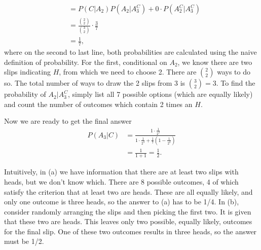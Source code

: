 \begin{exercise}[BH.2.21]
\begin{solution}
\begin{enumerate}
\begin{align*}
			&=P(C|A_{2})P(A_{2}|A_{3}^{C}) + 0\cdot P(A_{2}^{C}|A_{3}^{C})\\
			&=\frac{{2\choose 2}}{{3 \choose 2}}\cdot \frac{3}{7}\\
			& = \frac{1}{7},
		\end{align*}
		where on the second to last line, both probabilities are calculated using the naive definition of probability. For the first, conditional on $A_{2}$, we know there are two slips indicating $H$, from which we need to choose 2. There are ${2 \choose 2}$ ways to do so. The total number of ways to draw the 2 slips from 3 is ${3 \choose 2}=3$. To find the probability of $A_{2}|A_{3}^{C}$, simply list all 7 possible options (which are equally likely) and count the number of outcomes which contain 2 times an $H$.

		Now we are ready to get the final answer
		\begin{align*}
			P(A_{3}|C)& =  \frac{1\cdot \frac{1}{2^3}}{1\cdot \frac{1}{2^3} + \frac{1}{7}(1-\frac{1}{2^3})}\\
			&=\frac{1}{1+1}=\frac{1}{2}.
		\end{align*}

		Intuitively, in (a) we have information that there are at least two slips with heads, but we don't know which. There are 8 possible outcomes, 4 of which satisfy the criterion that at least two are heads. These are all equally likely, and only one outcome is three heads, so the answer to (a) has to be 1/4. In (b), consider randomly arranging the slips and then picking the first two. It is given that these two are heads. This leaves only two possible, equally likely, outcomes for the final slip. One of these two outcomes results in three heads, so the answer must be 1/2.
	\end{enumerate}
\end{solution}
\end{exercise}


